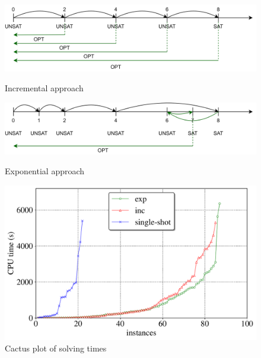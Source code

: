 \documentclass[submission,copyright,creativecommons]{eptcs}
\begin{document}
\begin{figure}
	\begin{minipage}{.5\textwidth}
		\includegraphics[width=\linewidth]{figures/incremental.pdf}
		\caption{Incremental approach \label{fig:inc}}
			\smallskip %
			\bigskip
		\includegraphics[width=\linewidth]{figures/exponential.pdf}
		\caption{Exponential approach \label{fig:exp}}
	\end{minipage}%
	\begin{minipage}{.5\textwidth}
		\includegraphics[width=\linewidth]{figures/cactus_time_font20.pdf}
		\caption{Cactus plot of solving times \label{fig:cactus:time}}
	\end{minipage}
\end{figure}
\end{document}

